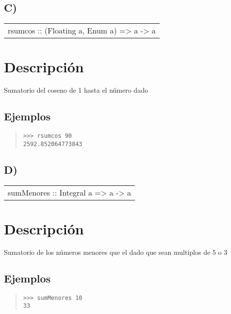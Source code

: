 \subsection{C)}
\begin{haddockdesc}
\item[\begin{tabular}{@{}l}
rsumcos :: (Floating a, Enum a) => a -> a
\end{tabular}]
{\haddockbegindoc
\section*{Descripción}
Sumatorio del coseno de 1 hasta el número dado\par
\subsection*{Ejemplos}
\begin{quote}
{\haddockverb\begin{verbatim}
>>> rsumcos 90
2592.852064773843

\end{verbatim}}
\end{quote}}
\end{haddockdesc}
\subsection{D)}
\begin{haddockdesc}
\item[\begin{tabular}{@{}l}
sumMenores :: Integral a => a -> a
\end{tabular}]
{\haddockbegindoc
\section*{Descripción}
Sumatorio de los números menores que el dado que sean multiplos de 5 o 3\par
\subsection*{Ejemplos}
\begin{quote}
{\haddockverb\begin{verbatim}
>>> sumMenores 10
33

\end{verbatim}}
\end{quote}}
\end{haddockdesc}
